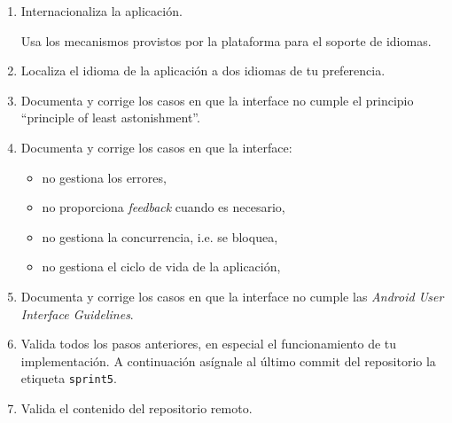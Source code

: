 \documentclass[11pt,a4paper]{article}
\begin{document}
\begin{enumerate}
\item Internacionaliza la aplicación.

  Usa los mecanismos provistos por la plataforma para el soporte de
  idiomas.

\item Localiza el idioma de la aplicación a dos idiomas de tu
  preferencia.

\item Documenta y corrige los casos en que la interface no cumple el
  principio ``principle of least astonishment''.

\item Documenta y corrige los casos en que la interface:
  \begin{itemize}
  \item no gestiona los errores,
  \item no proporciona \textit{feedback} cuando es necesario,
  \item no gestiona la concurrencia, i.e. se bloquea,
  \item no gestiona el ciclo de vida de la aplicación,
  \end{itemize}

\item Documenta y corrige los casos en que la interface no cumple las
  \emph{Android User Interface Guidelines}.

\item Valida todos los pasos anteriores, en especial el funcionamiento
  de tu implementación. A continuación asígnale al último commit del
  repositorio la etiqueta \texttt{sprint5}.

\item Valida el contenido del repositorio remoto.
\end{enumerate}
\end{document}
